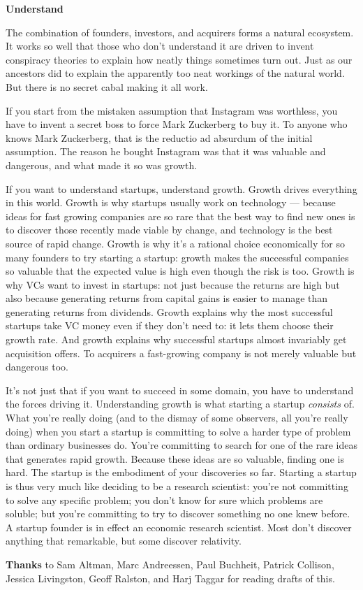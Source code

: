 \textbf{Understand}

The combination of founders, investors, and acquirers forms a natural
ecosystem. It works so well that those who don't understand it are
driven to invent conspiracy theories to explain how neatly things
sometimes turn out. Just as our ancestors did to explain the apparently
too neat workings of the natural world. But there is no secret cabal
making it all work.

If you start from the mistaken assumption that Instagram was worthless,
you have to invent a secret boss to force Mark Zuckerberg to buy it. To
anyone who knows Mark Zuckerberg, that is the reductio ad absurdum of
the initial assumption. The reason he bought Instagram was that it was
valuable and dangerous, and what made it so was growth.

If you want to understand startups, understand growth. Growth drives
everything in this world. Growth is why startups usually work on
technology --- because ideas for fast growing companies are so rare that
the best way to find new ones is to discover those recently made viable
by change, and technology is the best source of rapid change. Growth is
why it's a rational choice economically for so many founders to try
starting a startup: growth makes the successful companies so valuable
that the expected value is high even though the risk is too. Growth is
why VCs want to invest in startups: not just because the returns are
high but also because generating returns from capital gains is easier to
manage than generating returns from dividends. Growth explains why the
most successful startups take VC money even if they don't need to: it
lets them choose their growth rate. And growth explains why successful
startups almost invariably get acquisition offers. To acquirers a
fast-growing company is not merely valuable but dangerous too.

It's not just that if you want to succeed in some domain, you have to
understand the forces driving it. Understanding growth is what starting
a startup \emph{consists} of. What you're really doing (and to the
dismay of some observers, all you're really doing) when you start a
startup is committing to solve a harder type of problem than ordinary
businesses do. You're committing to search for one of the rare ideas
that generates rapid growth. Because these ideas are so valuable,
finding one is hard. The startup is the embodiment of your discoveries
so far. Starting a startup is thus very much like deciding to be a
research scientist: you're not committing to solve any specific problem;
you don't know for sure which problems are soluble; but you're
committing to try to discover something no one knew before. A startup
founder is in effect an economic research scientist. Most don't discover
anything that remarkable, but some discover relativity.


\textbf{Thanks} to Sam Altman, Marc Andreessen, Paul Buchheit, Patrick
Collison, Jessica Livingston, Geoff Ralston, and Harj Taggar for reading
drafts of this.